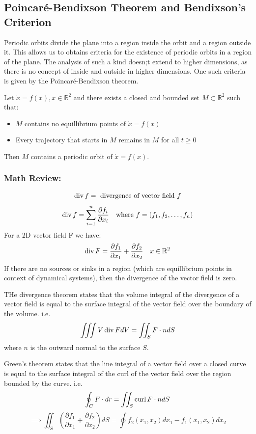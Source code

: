 \subsection{Poincar\'e-Bendixson Theorem and Bendixson's Criterion}
Periodic orbits divide the plane into a region inside the orbit and a region outside it.
This allows us to obtains criteria for the existence of periodic orbits in a region of the plane.
The analysis of such a kind doesn;t extend to higher dimensions, as there is no concept of
inside and outside in higher dimensions. One such criteria is given by the Poincar\'e-Bendixson
theorem.

\begin{theorem}
Let \(\dot{x} = f(x) , x \in \mathbb{R}^2\) and there exists a closed and bounded set
\(M \subset \mathbb{R}^2\) such that:
\begin{itemize}
    \item \(M\) contains no equillibrium points of \(\dot{x} = f(x)\)
    \item Every trajectory that starts in \(M\) remains in \(M\) for all \(t \geq 0\) 
\end{itemize} 
Then \(M\) contains a periodic orbit of \(\dot{x} = f(x)\).
\end{theorem}

\subsubsection*{Math Review:}
\[
    \operatorname{div} f = \text{ divergence of vector field } f
\]
\[
    \operatorname{div} f = \sum_{i=1}^{n} \frac{\partial f_i}{\partial x_i} \quad \text{where } f = (f_1, f_2, \dots, f_n)
\]
For a 2D vector field F we have:
\[
    \operatorname{div} F = \frac{\partial f_1}{\partial x_1} + \frac{\partial f_2}{\partial x_2} \quad x \in \mathbb{R}^2
\]
If there are no sources or sinks in a region (which are equillibrium points in context 
of dynamical systems), then the divergence of the vector field is zero.

\begin{theorem}
    THe divergence theorem states that the volume integral of the divergence of a vector field
    is equal to the surface integral of the vector field over the boundary of the volume. i.e.
    \[
        \iiint{V} \operatorname{div} F dV = \iint_{S} F \cdot n dS
    \]
    where \(n\) is the outward normal to the surface \(S\).

   Green's theorem states that the line integral of a vector field over a closed curve is equal
    to the surface integral of the curl of the vector field over the region bounded by the curve.
    i.e.
    \[
        \oint_{C} F \cdot dr = \iint_{S} \operatorname{curl} F \cdot n dS
    \]
    \[
        \implies \iint_S \left( 
            \frac{\partial f_1}{\partial x_1} + \frac{\partial f_2}{\partial x_2}
         \right) dS = \oint f_2(x_1, x_2) dx_1 - f_1(x_1, x_2) dx_2
    \]
\end{theorem}

